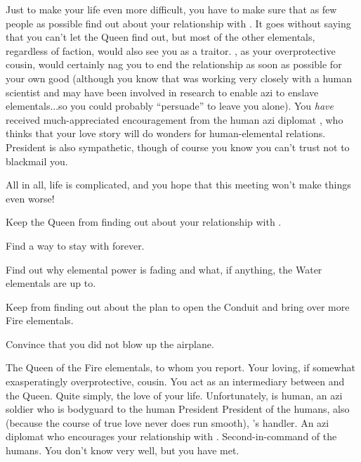 \documentclass[char]{elementals}
\begin{document}
Just to make your life even more difficult, you have to make sure that as few people as possible find out about your relationship with \cRomeo{}.  It goes without saying that you can't let the Queen find out, but most of the other elementals, regardless of faction, would also see you as a traitor.  \cPyro{}, as your overprotective cousin, would certainly nag you to end the relationship as soon as possible for your own good (although you know that \cPyro{\they} was working very closely with a human scientist \cMS{\intro} and may have been involved in research to enable azi to enslave elementals...so you could probably ``persuade'' \cPyro{\them} to leave you alone).  You \emph{have} received much-appreciated encouragement from the human azi diplomat \cDiplomat{\intro}, who thinks that your love story will do wonders for human-elemental relations.  President \cLeader{} is also sympathetic, though of course you know you can't trust \cLeader{\them} not to blackmail you.

All in all, life is complicated, and you hope that this meeting won't make things even worse!

\begin{itemz}[Goals]
  \item Keep the Queen from finding out about your relationship with \cRomeo{}.
  \item Find a way to stay with \cRomeo{} forever.
  \item Find out why elemental power is fading and what, if anything, the Water elementals are up to.
  \item Keep \cRomeo{} from finding out about the plan to open the Conduit and bring over more Fire elementals.
  \item Convince \cRomeo{} that you did not blow up the airplane.
\end{itemz}

\begin{contacts}
  \contact{\cQueen{}} The Queen of the Fire elementals, to whom you report.
  \contact{\cPyro{}} Your loving, if somewhat exasperatingly overprotective, cousin.
  \contact{\cKing{}} You act as an intermediary between \cKing{\them} and the Queen.
  \contact{\cRomeo{}} Quite simply, the love of your life.  Unfortunately, \cRomeo{\they} is human, an azi soldier who is bodyguard to the human President
  \contact{\cLeader{}} President of the humans, also (because the course of true love never does run smooth), \cRomeo{}'s handler.
  \contact{\cDiplomat{}} An azi diplomat who encourages your relationship with \cRomeo{}.
  \contact{\cDema{}} Second-in-command of the humans.  You don't know \cDema{\them} very well, but you have met.
\end{contacts}
\end{document}

